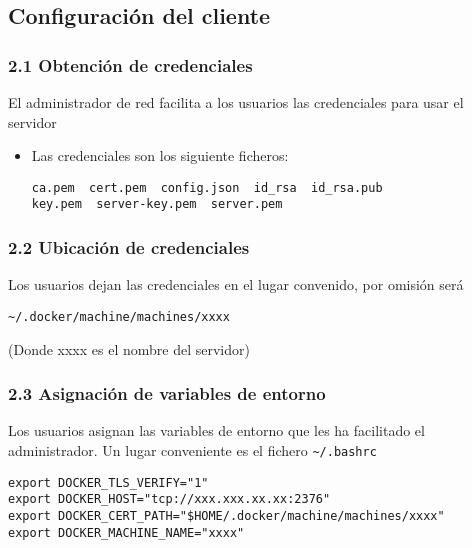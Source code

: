 \documentclass[ucs]{beamer}
\begin{document}
\subsection{Configuración del cliente}
\begin{frame}[fragile]
\frametitle{2.1 Obtención de credenciales }


El administrador de red facilita a los usuarios las credenciales
para usar el servidor



\begin{itemize}
\item
Las credenciales son los siguiente ficheros:

  \begin{scriptsize}
  \begin{verbatim}
ca.pem	cert.pem  config.json  id_rsa  id_rsa.pub  
key.pem  server-key.pem  server.pem
  \end{verbatim}
  \end{scriptsize}

\end{itemize}


\end{frame}
\begin{frame}[fragile]
\frametitle{2.2 Ubicación de credenciales }



Los usuarios dejan las credenciales en el lugar convenido, por omisión será

  \begin{scriptsize}
  \begin{verbatim}
~/.docker/machine/machines/xxxx
  \end{verbatim}
  \end{scriptsize}

(Donde xxxx es el nombre del servidor)


\end{frame}
\begin{frame}[fragile]
\frametitle{2.3 Asignación de variables de entorno }


Los usuarios asignan las variables de entorno que les ha facilitado
el administrador. Un lugar conveniente es el fichero \verb|~/.bashrc|



  \begin{scriptsize}
  \begin{verbatim}
export DOCKER_TLS_VERIFY="1"
export DOCKER_HOST="tcp://xxx.xxx.xx.xx:2376"
export DOCKER_CERT_PATH="$HOME/.docker/machine/machines/xxxx"
export DOCKER_MACHINE_NAME="xxxx"
  \end{verbatim}
  \end{scriptsize}

\end{frame}
\end{document}
